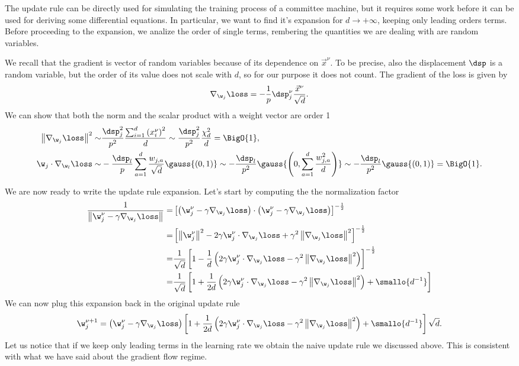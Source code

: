 The update rule can be directly used for simulating the training process of a committee
machine, but it requires some work before it can be used for deriving some differential equations.
In particular, we want to find it's expansion for \(d\to+\infty\), keeping only leading orders terms.
Before proceeding to the expansion, we analize the order of single terms,
rembering the quantities we are dealing with are random variables.

We recall that the gradient is vector of random variables because of its dependence on \(\vec{x}^\nu\).
To be precise, also the displacement \(\dsp\) is a random variable, but the order of its value does not scale with \(d\),
so for our purpose it does not count. The gradient of the loss is given by
\[\nabla_{\w_j}{\loss} = -\frac{1}{p}\dsp^\nu_j \frac{\vec{x}^\nu}{\sqrt{d}}.\]
We can show that both the norm and the scalar product with a weight vector are order 1
\[\begin{split}
  \left\|\nabla_{\w_j}{\loss}\right\|^2 \sim&
    \frac{\dsp^2_j}{p^2} \frac{\sum_{i=1}^d \left(x^\nu_i\right)^2}{d}\sim
    \frac{\dsp^2_j}{p^2}\frac{\chi^2_d}{d} = \BigO{1},\\
  \w_j\cdot\nabla_{\w_l}{\loss} \sim&
    -\frac{\dsp_l}{p}\sum_{a=1}^d\frac{w_{j,a}}{\sqrt{d}}\gauss{(0,1)} \sim
    -\frac{\dsp_l}{p^2}\gauss{\left(0,\sum_{a=1}^d\frac{w^2_{j,a}}{d}\right)} \sim
    -\frac{\dsp_l}{p^2}\gauss{\left(0,1\right)}= \BigO{1}.
\end{split}\]

We are now ready to write the update rule expansion.
 Let's start by computing the the normalization factor
\[\begin{split}
  \frac{1}{\left\|\w^{\nu}_j - \gamma \nabla_{\w_j}{\loss}\right\|} =&
    \left[\left(\w^{\nu}_j - \gamma \nabla_{\w_j}{\loss}\right)\cdot\left(\w^{\nu}_j - \gamma \nabla_{\w_j}{\loss}\right)\right]^{-\frac12} \\
    =&\left[\left\|\w^{\nu}_j\right\|^2 - 2\gamma\w^{\nu}_j\cdot \nabla_{\w_j}{\loss}+\gamma^2\left\|\nabla_{\w_j}{\loss}\right\|^2\right]^{-\frac12} \\
    =&\frac{1}{\sqrt{d}}\left[1- \frac1d\left(2\gamma\w^{\nu}_j\cdot \nabla_{\w_j}{\loss}-\gamma^2\left\|\nabla_{\w_j}{\loss}\right\|^2\right)\right]^{-\frac12} \\
    =&\frac{1}{\sqrt{d}}\left[1+ \frac{1}{2d}\left(2\gamma\w^{\nu}_j\cdot \nabla_{\w_j}{\loss}-\gamma^2\left\|\nabla_{\w_j}{\loss}\right\|^2\right)+\smallo{d^{-1}}\right]
\end{split}\]
We can now plug this expansion back in the original update rule
\[
  \w^{\nu+1}_j =\left(\w^{\nu}_j - \gamma \nabla_{\w_j}{\loss}\right)\left[1+ \frac{1}{2d}\left(2\gamma\w^{\nu}_j\cdot \nabla_{\w_j}{\loss}-\gamma^2\left\|\nabla_{\w_j}{\loss}\right\|^2\right)+\smallo{d^{-1}}\right]\sqrt{d}.
\]
Let us notice that if we keep only leading terms in the learning rate we obtain 
the naive update rule we discussed above. 
This is consistent with what we have said about the gradient flow regime. 

